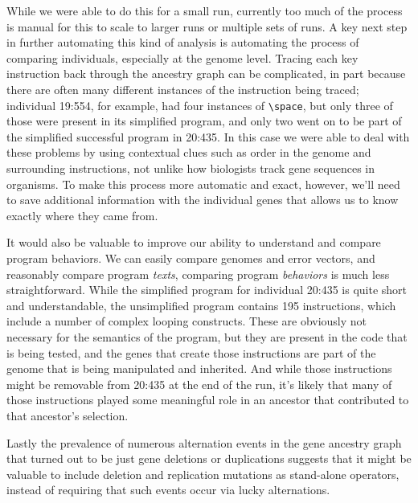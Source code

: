 \documentclass[graybox]{svmult}
\begin{document}
While we were able to do this for a small run, currently too much of the
process is manual for this to scale to larger runs or multiple sets of runs.
A key next step in further automating this kind of analysis is automating the 
process of comparing individuals, especially at the genome level. Tracing
each key instruction back through the ancestry graph can be complicated, in
part because there are often many different instances of the instruction being traced; individual 19:554, for example, had four instances of 
\texttt{\textbackslash space}, but only three of those were present in its
simplified program, and only two went on to be part of the simplified
successful program in 20:435. In this case we were able to deal with these
problems by using contextual clues such as order in the genome and surrounding
instructions, not unlike how biologists track gene sequences in organisms.
To make this process more automatic and exact, however, we'll need to save additional
information with the individual genes that allows us to know exactly where they 
came from.

It would also be valuable to improve our ability to understand and compare
program behaviors. We can easily compare genomes and error vectors,
and reasonably compare program \emph{texts}, comparing program \emph{behaviors}
is much less straightforward. While the simplified program for individual
20:435 is quite short and understandable, the unsimplified program contains
195 instructions, which include a number of complex looping constructs. These
are obviously not necessary for the semantics of the program, but they are
present in the code that is being tested, and the genes that create those
instructions are part of the genome that is being manipulated and inherited.
And while those instructions might be removable from 20:435 at the end 
of the run, it's likely that many of those instructions played some
meaningful role in an ancestor that contributed to that ancestor's selection.

Lastly the prevalence of numerous alternation events in the 
gene ancestry graph that turned out to be just gene deletions or duplications 
suggests that it might be valuable to include deletion and replication 
mutations as stand-alone operators, instead of requiring that such events
occur via lucky alternations.
\end{document}
